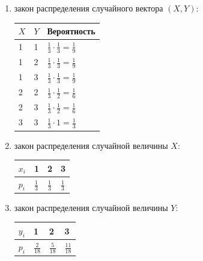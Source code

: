 \documentclass[12pt,a4paper]{article}
\begin{document}
    \begin{enumerate}
        \item закон распределения случайного вектора $\left ( X, Y \right )$:

        \begin{tabular}{|p{1cm}|p{1cm}|p{3cm}|}
            \hline
            $X$ & $Y$ & Вероятность                                   \\
            \hline
            \hline
            1   & 1   & $\frac{1}{3} \cdot \frac{1}{3} = \frac{1}{9}$ \\
            \hline
            1   & 2   & $\frac{1}{3} \cdot \frac{1}{3} = \frac{1}{9}$ \\
            \hline
            1   & 3   & $\frac{1}{3} \cdot \frac{1}{3} = \frac{1}{9}$ \\
            \hline
            2   & 2   & $\frac{1}{3} \cdot \frac{1}{2} = \frac{1}{6}$ \\
            \hline
            2   & 3   & $\frac{1}{3} \cdot \frac{1}{2} = \frac{1}{6}$ \\
            \hline
            3   & 3   & $\frac{1}{3} \cdot 1 = \frac{1}{3}$           \\
            \hline
        \end{tabular}

        \item закон распределения случайной величины $X$:

        \begin{tabular}{|p{1cm}|p{1cm}|p{1cm}|p{1cm}|}
            \hline
            $x_i$ & 1             & 2             & 3             \\
            \hline
            $p_i$ & $\frac{1}{3}$ & $\frac{1}{3}$ & $\frac{1}{3}$ \\
            \hline
        \end{tabular}

        \item закон распределения случайной величины $Y$:

        \begin{tabular}{|p{1cm}|p{1cm}|p{1cm}|p{1cm}|}
            \hline
            $y_i$ & 1              & 2              & 3               \\
            \hline
            $p_i$ & $\frac{2}{18}$ & $\frac{5}{18}$ & $\frac{11}{18}$ \\
            \hline
        \end{tabular}


\end{enumerate}
\end{document}
